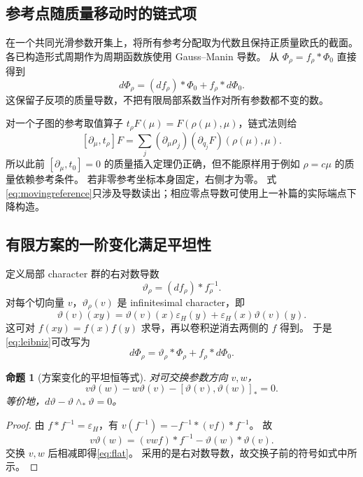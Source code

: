 \documentclass[11pt,a4paper]{ctexart}
\theoremstyle{cnplain}
\newtheorem{proposition}[theorem]{命题}
\theoremstyle{remark}\newtheorem{remark}[theorem]{注}
\newcommand{\eps}{\varepsilon_H}
\begin{document}
\subsection{参考点随质量移动时的链式项}
在一个共同光滑参数开集上，将所有参考分配取为代数且保持正质量欧氏的截面。
各已构造形式周期作为周期函数族使用 Gauss--Manin 导数。
从 $\Phi_\rho=f_\rho*\Phi_0$ 直接得到
\begin{equation}\label{eq:leibniz}
 d\Phi_\rho=(df_\rho)*\Phi_0+f_\rho*d\Phi_0.
\end{equation}
这保留子反项的质量导数，不把有限局部系数当作对所有参数都不变的数。

对一个子图的参考取值算子
$t_\rho F(\mu)=F(\rho(\mu),\mu)$，链式法则给
\begin{equation}\label{eq:movingreference}
 [\partial_\mu,t_\rho]F
    =\sum_j(\partial_\mu\rho_j)
                           (\partial_{q_j}F)(\rho(\mu),\mu).
\end{equation}
所以此前 $[\partial_\mu,t_0]=0$ 的质量插入定理仍正确，但不能原样用于例如 $\rho=c\mu$ 的质量依赖参考条件。
若非零参考坐标本身固定，右侧才为零。
式\eqref{eq:movingreference}只涉及导数读出；相应零点导数可使用上一补篇的实际端点下降构造。

\subsection{有限方案的一阶变化满足平坦性}
定义局部 character 群的右对数导数
\begin{equation}\label{eq:connection}
 \vartheta_\rho=(df_\rho)*f_\rho^{-1}.
\end{equation}
对每个切向量 $v$，$\vartheta_\rho(v)$ 是 infinitesimal character，即
\begin{equation}\label{eq:infchar}
 \vartheta(v)(xy)=\vartheta(v)(x)\eps(y)
                              +\eps(x)\vartheta(v)(y).
\end{equation}
这可对 $f(xy)=f(x)f(y)$ 求导，再以卷积逆消去两侧的 $f$ 得到。
于是\eqref{eq:leibniz}可改写为
\begin{equation}\label{eq:gauge}
 d\Phi_\rho=\vartheta_\rho*\Phi_\rho+f_\rho*d\Phi_0.
\end{equation}

\begin{proposition}[方案变化的平坦恒等式]\label{prop:flat}
对可交换参数方向 $v,w$，
\begin{equation}\label{eq:flat}
 v\vartheta(w)-w\vartheta(v)
                   -[\vartheta(v),\vartheta(w)]_*=0.
\end{equation}
等价地，$d\vartheta-\vartheta\wedge_*\vartheta=0$。
\end{proposition}
\begin{proof}
由 $f*f^{-1}=\eps$，有
$v(f^{-1})=-f^{-1}*(vf)*f^{-1}$。
故
\[
 v\vartheta(w)=(vwf)*f^{-1}-\vartheta(w)*\vartheta(v).
\]
交换 $v,w$ 后相减即得\eqref{eq:flat}。
采用的是右对数导数，故交换子前的符号如式中所示。
\end{proof}
\end{document}
